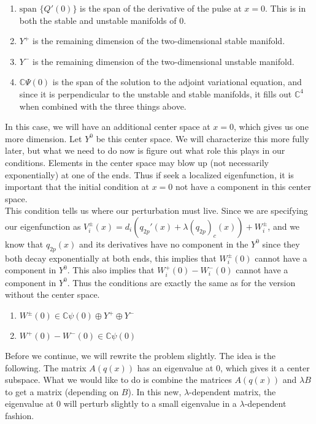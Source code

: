 \documentclass[12pt]{article}
\def\C{{\mathbb C}}
\begin{document}
\begin{enumerate}
	\item $\text{span }\{Q'(0)\}$ is the span of the derivative of the pulse at $x = 0$. This is in both the stable and unstable manifolds of 0.
	\item $Y^+$ is the remaining dimension of the two-dimensional stable manifold.
	\item $Y^-$ is the remaining dimension of the two-dimensional unstable manifold.
	\item $\C \Psi(0)$ is the span of the solution to the adjoint variational equation, and since it is perpendicular to the unstable and stable manifolds, it fills out $\C^4$ when combined with the three things above.
\end{enumerate}

In this case, we will have an additional center space at $x = 0$, which gives us one more dimension. Let $Y^0$ be this center space. We will characterize this more fully later, but what we need to do now is figure out what role this plays in our conditions. Elements in the center space may blow up (not necessarily exponentially) at one of the ends. Thus if seek a localized eigenfunction, it is important that the initial condition at $x = 0$ not have a component in this center space. \\

This condition tells us where our perturbation must live. Since we are specifying our eigenfunction as $V_i^\pm(x) = d_i(q_{2p}'(x) + \lambda (q_{2p})_c(x)) + W_i^\pm $, and we know that $q_{2p}(x)$ and its derivatives have no component in the $Y^0$ since they both decay exponentially at both ends, this implies that $W_i^\pm(0)$ cannot have a component in $Y^0$. This also implies that $W_i^+(0) - W_i^-(0)$ cannot have a component in $Y^0$. Thus the conditions are exactly the same as for the version without the center space.\\

\begin{enumerate}
\item $W^\pm(0) \in \C \psi(0) \oplus Y^+ \oplus Y^-$
\item $W^+(0) - W^-(0) \in \C \psi(0) $
\end{enumerate}

Before we continue, we will rewrite the problem slightly. The idea is the following. The matrix $A(q(x))$ has an eigenvalue at 0, which gives it a center subspace. What we would like to do is combine the matrices $A(q(x))$ and $\lambda B$ to get a matrix (depending on $B$). In this new, $\lambda$-dependent matrix, the eigenvalue at 0 will perturb slightly to a small eigenvalue in a $\lambda$-dependent fashion.\\
\end{document}
